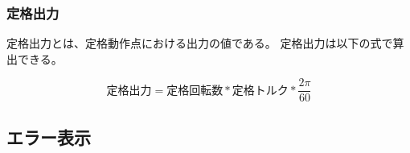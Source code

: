 
\subsubsection{定格出力}\label{sub:sub:teikakusyutu}
定格出力とは、定格動作点における出力の値である。
定格出力は以下の式で算出できる。

\[
    \mbox{定格出力} = \mbox{定格回転数} * \mbox{定格トルク} *  \frac{2\pi}{60}
\]


\subsection{エラー表示}\label{error}
